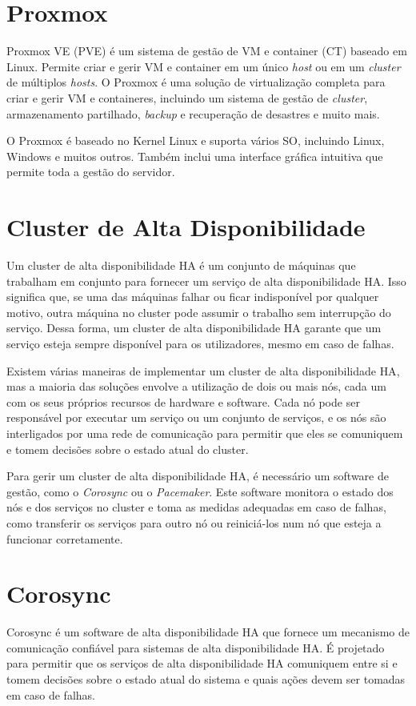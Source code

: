 \section{Proxmox}
Proxmox VE (\ac{PVE}) é um sistema de gestão de \ac{VM} e container (CT) baseado em Linux. Permite criar e gerir \ac{VM} e container em um único \textit{host} ou em um \textit{cluster} de múltiplos \textit{hosts}. O Proxmox é uma solução de virtualização completa para criar e gerir \ac{VM} e containeres, incluindo um sistema de gestão de \textit{cluster}, armazenamento partilhado, \textit{backup} e recuperação de desastres e muito mais.

O Proxmox é baseado no Kernel Linux e suporta vários \ac{SO}, incluindo Linux, Windows e muitos outros. Também inclui uma interface gráfica intuitiva que permite toda a gestão do servidor. 

\section{Cluster de Alta Disponibilidade}
Um cluster de alta disponibilidade \ac{HA} é um conjunto de máquinas que trabalham em conjunto para fornecer um serviço de alta disponibilidade \ac{HA}. Isso significa que, se uma das máquinas falhar ou ficar indisponível por qualquer motivo, outra máquina no cluster pode assumir o trabalho sem interrupção do serviço. Dessa forma, um cluster de alta disponibilidade \ac{HA} garante que um serviço esteja sempre disponível para os utilizadores, mesmo em caso de falhas.

Existem várias maneiras de implementar um cluster de alta disponibilidade \ac{HA}, mas a maioria das soluções envolve a utilização de dois ou mais nós, cada um com os seus próprios recursos de hardware e software. Cada nó pode ser responsável por executar um serviço ou um conjunto de serviços, e os nós são interligados por uma rede de comunicação para permitir que eles se comuniquem e tomem decisões sobre o estado atual do cluster.

Para gerir um cluster de alta disponibilidade \ac{HA}, é necessário um software de gestão, como o \textit{Corosync} ou o \textit{Pacemaker}. Este software monitora o estado dos nós e dos serviços no cluster e toma as medidas adequadas em caso de falhas, como transferir os serviços para outro nó ou reiniciá-los num nó que esteja a funcionar corretamente.

\section{Corosync}
Corosync é um software de alta disponibilidade \ac{HA} que fornece um mecanismo de comunicação confiável para sistemas de alta disponibilidade \ac{HA}. É projetado para permitir que os serviços de alta disponibilidade \ac{HA} comuniquem entre si e tomem decisões sobre o estado atual do sistema e quais ações devem ser tomadas em caso de falhas.

